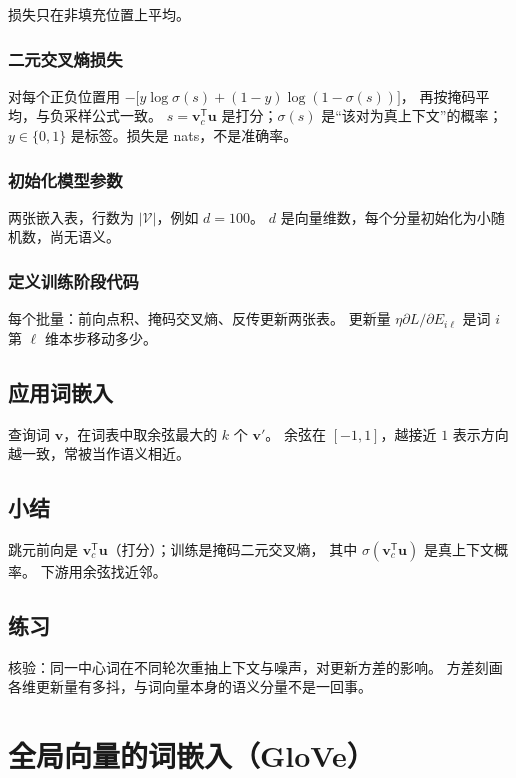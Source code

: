 损失只在非填充位置上平均。

\subsubsection{二元交叉熵损失}

对每个正负位置用
$-\bigl[y\log\sigma(s)+(1-y)\log(1-\sigma(s))\bigr]$，
再按掩码平均，与负采样公式一致。
$s=\bm{v}_c^{\mathsf T}\bm{u}$ 是打分；$\sigma(s)$ 是“该对为真上下文”的概率；
$y\in\{0,1\}$ 是标签。损失是 nats，不是准确率。

\subsubsection{初始化模型参数}

两张嵌入表，行数为 $|\mathcal{V}|$，例如 $d=100$。
$d$ 是向量维数，每个分量初始化为小随机数，尚无语义。

\subsubsection{定义训练阶段代码}

每个批量：前向点积、掩码交叉熵、反传更新两张表。
更新量 $\eta\partial L/\partial E_{i\ell}$ 是词 $i$ 第 $\ell$ 维本步移动多少。

\subsection{应用词嵌入}

查询词 $\bm{v}$，在词表中取余弦最大的 $k$ 个 $\bm{v}'$。
余弦在 $[-1,1]$，越接近 $1$ 表示方向越一致，常被当作语义相近。

\subsection{小结}

跳元前向是 $\bm{v}_c^{\mathsf T}\bm{u}$（打分）；训练是掩码二元交叉熵，
其中 $\sigma(\bm{v}_c^{\mathsf T}\bm{u})$ 是真上下文概率。
下游用余弦找近邻。

\subsection{练习}

核验：同一中心词在不同轮次重抽上下文与噪声，对更新方差的影响。
方差刻画各维更新量有多抖，与词向量本身的语义分量不是一回事。

\section{全局向量的词嵌入（GloVe）}

